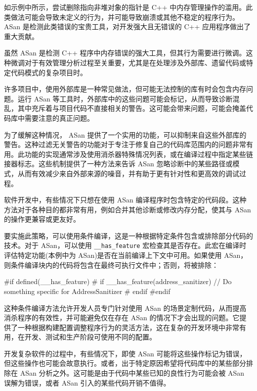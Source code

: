 如示例中所示，尝试删除指向非堆对象的指针是 C++ 中内存管理操作的滥用。此类做法可能会导致未定义的行为，并可能导致崩溃或其他不稳定的程序行为。 ASan 是检测此类错误的宝贵工具，对开发强大且无错误的 C++ 应用程序做出了重大贡献。


虽然 ASan 是检测 C++ 程序中内存错误的强大工具，但其行为需要进行微调。这种微调对于有效管理分析过程至关重要，尤其是在处理涉及外部库、遗留代码或特定代码模式的复杂项目时。


许多项目中，使用外部库是一种常见做法，但可能无法控制的库有时会包含内存问题。运行 ASan 等工具时，外部库中的这些问题可能会标记，从而导致诊断混乱，其中充斥着与项目代码不直接相关的警告。这可能会带来问题，可能会掩盖代码库中需要注意的真正问题。

为了缓解这种情况， ASan 提供了一个实用的功能，可以抑制来自这些外部库的警告。这种过滤无关警告的功能对于专注于修复自己的代码库范围内的问题非常有用。此功能的实现通常涉及使用消杀器特殊情况列表，或在编译过程中指定某些链接器标志。这些机制提供了一种方法来告诉 ASan 忽略诊断中的某些路径或模式，从而有效减少来自外部来源的噪音，并有助于更有针对性和更高效的调试过程。


软件开发中，有些情况下只想在使用 ASan 编译程序时包含特定的代码段。这种方法对于各种目的都非常有用，例如合并其他诊断或修改内存分配，使其与 ASan 的操作更兼容或更友好。

要实施此策略，可以使用条件编译，这是一种根据特定条件包含或排除部分代码的技术。对于 ASan，可以使用 \verb|__has_feature| 宏检查其是否存在。此宏在编译时评估特定功能(本例中为 ASan)是否在当前编译上下文中可用。如果使用 ASan，则条件编译块内的代码将包含在最终可执行文件中；否则，将被排除：

\begin{cpp}
#if defined(__has_feature)
# if __has_feature(address_sanitizer)
// Do something specific for AddressSanitizer
# endif
#endif
\end{cpp}

这种条件编译方法允许开发人员专门针对使用 ASan 的场景定制代码，从而提高消杀程序的有效性，并可能避免仅在存在 ASan 的情况下才会出现的问题。它提供了一种根据构建配置调整程序行为的灵活方法，这在复杂的开发环境中非常有用，在开发、测试和生产阶段可使用不同的配置。


开发复杂软件的过程中，有些情况下，即使 ASan 可能将这些操作标记为错误，但这些操作也可能会故意执行。或者，出于特定原因希望将代码库中的某些部分排除在 ASan 分析之外。这可能是由于代码中某些已知的良性行为可能会被 ASan 误解为错误，或者 ASan 引入的某些代码开销不值得。

